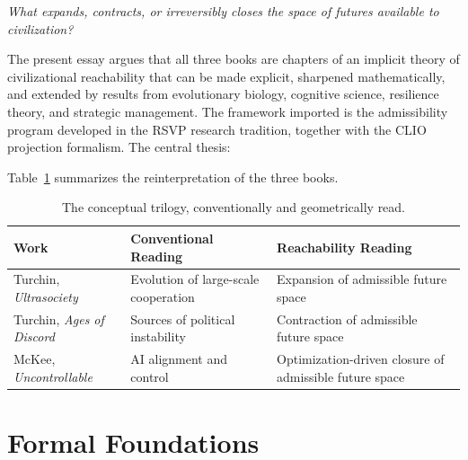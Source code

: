 \documentclass[12pt, a4paper]{article}
\theoremstyle{plain}
\theoremstyle{definition}
\theoremstyle{remark}
\begin{document}
\begin{center}
\textit{What expands, contracts, or irreversibly closes the space of futures available to civilization?}
\end{center}

The present essay argues that all three books are chapters of an implicit theory of civilizational reachability that can be made explicit, sharpened mathematically, and extended by results from evolutionary biology, cognitive science, resilience theory, and strategic management. The framework imported is the admissibility program developed in the RSVP research tradition, together with the CLIO projection formalism. The central thesis:

\medskip
\noindent{}
\medskip

Table~\ref{tab:trilogy} summarizes the reinterpretation of the three books.

\begin{table}[h]
\centering
\renewcommand{\arraystretch}{1.45}
\begin{tabular}{p{3.2cm} p{4.4cm} p{5.6cm}}
\toprule
\textbf{Work} & \textbf{Conventional Reading} & \textbf{Reachability Reading} \\
\midrule
Turchin, \textit{Ultrasociety} & Evolution of large-scale cooperation & Expansion of admissible future space \\
Turchin, \textit{Ages of Discord} & Sources of political instability & Contraction of admissible future space \\
McKee, \textit{Uncontrollable} & AI alignment and control & Optimization-driven closure of admissible future space \\
\bottomrule
\end{tabular}
\caption{The conceptual trilogy, conventionally and geometrically read.}
\label{tab:trilogy}
\end{table}

\section{Formal Foundations}
\end{document}
